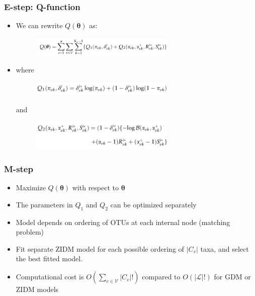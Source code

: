 \documentclass{beamer}
\begin{document}
\begin{frame}
\frametitle{E-step: Q-function}
\begin{itemize}
  \item We can rewrite $Q(\boldsymbol\theta)$ as:
  \begin{figure}[!htb]
	\centering
	\includegraphics[width=0.65\textwidth]{img/qfun2.png}
\end{figure}
\item where
\begin{figure}[!htb]
	\centering
	\includegraphics[width=0.65\textwidth]{img/q1.png}
\end{figure}
and
\begin{figure}[!htb]
	\centering
	\includegraphics[width=0.65\textwidth]{img/q2.png}
\end{figure}
\end{itemize}
\end{frame}
\begin{frame}
\frametitle{M-step}
\begin{itemize}
  \item Maximize $Q(\boldsymbol\theta)$ with respect to $\boldsymbol\theta$
  \item The parameters in $Q_1$ and $Q_2$ can be optimized separately
  \item Model depends on ordering of OTUs at each internal node (matching problem)
  \item Fit separate ZIDM model for each possible ordering of $|C_v|$ taxa, and select the best fitted model.
  \item Computational cost is
  $O(\sum_{v \in \mathcal{V}}|C_v|!)$
  compared to $O(|\mathcal{L}|!)$ for GDM or ZIDM models
\end{itemize}
\end{frame}
\end{document}
